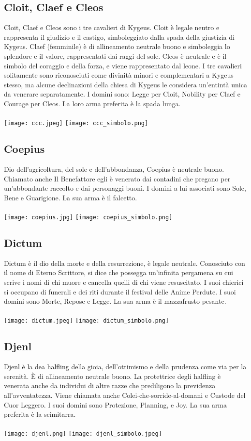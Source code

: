 \documentclass[a4paper]{report}
\begin{document}
\begin{multicols}{2}
\subsection*{Cloit, Claef e Cleos}
Cloit, Claef e Cleos sono i tre cavalieri di Kygeus. Cloit è legale neutro e rappresenta il giudizio e il castigo, simboleggiato dalla spada della giustizia di Kygeus. Claef (femminile) è di allineamento neutrale buono e simboleggia lo splendore e il valore, rappresentati dai raggi del sole. Cleos è neutrale e è il simbolo del coraggio e della forza, e viene rappresentato dal leone. I tre cavalieri solitamente sono riconosciuti come divinità minori e complementari a Kygeus stesso, ma alcune declinazioni della chiesa di Kygeus le considera un'entintà unica da venerare separatamente. I domini sono: Legge per Cloit, Nobility per Claef e Courage per Cleos. La loro arma preferita è la spada lunga.\\
\\
\texttt{[image: ccc.jpeg]}
\texttt{[image: ccc\_simbolo.png]}
\subsection*{Coepius}
Dio dell'agricoltura, del sole e dell'abbondanza, Coepius è neutrale buono. Chiamato anche Il Benefattore egli è venerato dai contadini che pregano per un'abbondante raccolto e dai personaggi buoni. I domini a lui associati sono Sole, Bene e Guarigione. La sua arma è il falcetto.\\
\\
\texttt{[image: coepius.jpg]}
\texttt{[image: coepius\_simbolo.png]}
\subsection*{Dictum}
Dictum è il dio della morte e della resurrezione, è legale neutrale. Conosciuto con il nome di Eterno Scrittore, si dice che possegga un'infinita pergamena su cui scrive i nomi di chi muore e cancella quelli di chi viene resuscitato. I suoi chierici si occupano di funerali e dei riti durante il festival delle Anime Perdute. I suoi domini sono Morte, Repose e Legge. La sua arma è il mazzafrusto pesante.\\
\\
\texttt{[image: dictum.jpeg]}
\texttt{[image: dictum\_simbolo.png]}
\subsection*{Djenl}
Djenl è la dea halfling della gioia, dell'ottimismo e della prudenza come via per la serenità. È di allineamento neutrale buono. La protettrice degli halfling è venerata anche da individui di altre razze che prediligono la previdenza all'avventatezza. Viene chiamata anche Colei-che-sorride-al-domani e Custode del Cuor Leggero. I suoi domini sono Protezione, Planning, e Joy. La sua arma preferita è la scimitarra.\\
\\
\texttt{[image: djenl.png]}
\texttt{[image: djenl\_simbolo.jpeg]}

\end{multicols}
\end{document}
